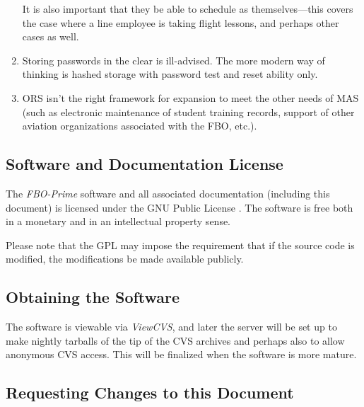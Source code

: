 \documentclass[letterpaper,10pt,titlepage]{article}
\newcommand{\productbasename}{FBO-Prime}
\begin{document}
\begin{enumerate}
      It is also important that they be able to schedule as themselves---this covers the case
      where a line employee is taking flight lessons, and perhaps other cases as well.
\item Storing passwords in the clear is ill-advised.  The more modern way of thinking
      is hashed storage with password test and reset ability only.
\item ORS isn't the right framework for expansion to meet the other needs
      of MAS (such as electronic maintenance of student training records, 
      support of other aviation organizations associated with the FBO, etc.). 
\end{enumerate}



\subsection{Software and Documentation License}
\label{siov0:slic0}

The \emph{\productbasename{}} software and all associated documentation
(including this document)
is licensed under the 
GNU Public License \cite{bibref:gnuorgweb}.
The software is free both in a monetary and in an intellectual property sense.

Please note that the GPL may impose the requirement that if the source code
is modified, the modifications be made available publicly.



\subsection{Obtaining the Software}
\label{siov0:sosw0}

The software is viewable via \emph{ViewCVS}, and
later the server will be set up to make nightly tarballs of the tip of the
CVS archives and perhaps also to allow anonymous CVS
access.  This will be finalized when the software is more mature.



\subsection{Requesting Changes to this Document}
\label{siov0:scdo0}
\end{document}
